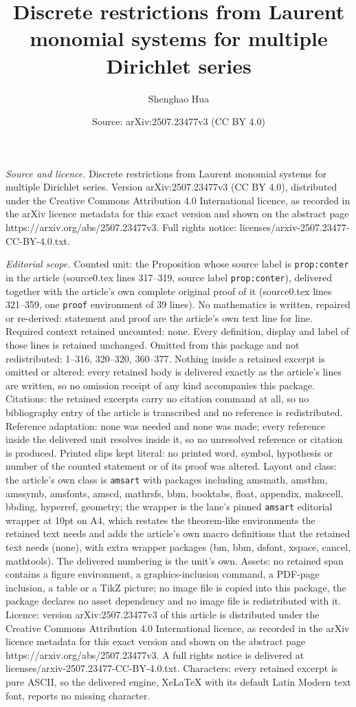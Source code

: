 \documentclass[10pt,a4paper]{amsart}
\title[Discrete restrictions from Laurent monomial systems for mult]{Discrete restrictions from Laurent monomial systems for multiple Dirichlet series}
\author{Shenghao Hua}
\date{Source: arXiv:2507.23477v3 (CC BY 4.0)}
\begin{document}
\maketitle

\noindent\emph{Source and licence.} Discrete restrictions from Laurent monomial systems for multiple Dirichlet series. Version arXiv:2507.23477v3 (CC BY 4.0), distributed under the Creative Commons Attribution 4.0 International licence, as recorded in the arXiv licence metadata for this exact version and shown on the abstract page https://arxiv.org/abs/2507.23477v3. Full rights notice: licenses/arxiv-2507.23477-CC-BY-4.0.txt.\par\smallskip

\noindent\textit{Editorial scope.} Counted unit: the Proposition whose source label is \texttt{prop:conter} in the article (source0.tex lines 317--319, source label \texttt{prop:conter}), delivered together with the article's own complete original proof of it (source0.tex lines 321--359, one \texttt{proof} environment of 39 lines). No mathematics is written, repaired or re-derived: statement and proof are the article's own text line for line. Required context retained uncounted: none. Every definition, display and label of those lines is retained unchanged. Omitted from this package and not redistributed: 1--316, 320--320, 360--377. Nothing inside a retained excerpt is omitted or altered: every retained body is delivered exactly as the article's lines are written, so no omission receipt of any kind accompanies this package. Citations: the retained excerpts carry no citation command at all, so no bibliography entry of the article is transcribed and no reference is redistributed. Reference adaptation: none was needed and none was made; every reference inside the delivered unit resolves inside it, so no unresolved reference or citation is produced. Printed slips kept literal: no printed word, symbol, hypothesis or number of the counted statement or of its proof was altered. Layout and class: the article's own class is \texttt{amsart} with packages including amsmath, amsthm, amssymb, amsfonts, amscd, mathrsfs, bbm, booktabs, float, appendix, makecell, bbding, hyperref, geometry; the wrapper is the lane's pinned \texttt{amsart} editorial wrapper at 10pt on A4, which restates the theorem-like environments the retained text needs and adds the article's own macro definitions that the retained text needs (none), with extra wrapper packages (bm, bbm, dsfont, xspace, cancel, mathtools). The delivered numbering is the unit's own. Assets: no retained span contains a figure environment, a graphics-inclusion command, a PDF-page inclusion, a table or a TikZ picture; no image file is copied into this package, the package declares no asset dependency and no image file is redistributed with it. Licence: version arXiv:2507.23477v3 of this article is distributed under the Creative Commons Attribution 4.0 International licence, as recorded in the arXiv licence metadata for this exact version and shown on the abstract page https://arxiv.org/abs/2507.23477v3. A full rights notice is delivered at licenses/arxiv-2507.23477-CC-BY-4.0.txt. Characters: every retained excerpt is pure ASCII, so the delivered engine, XeLaTeX with its default Latin Modern text font, reports no missing character.
\end{document}
